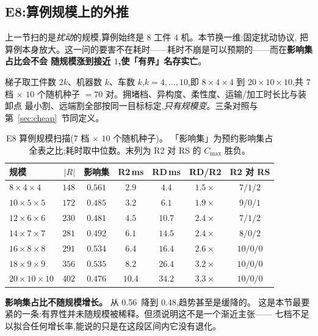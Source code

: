\documentclass[manuscript,screen,review]{acmart}
\newcommand{\NSeeds}{10}
\newcommand{\ScaleKs}{7}
\newcommand{\ScalePairs}{70}
\newcommand{\ScaleJobsHi}{20}
\newcommand{\ScaleMachHi}{10}
\newcommand{\ScaleCloLo}{0.48}       %
\newcommand{\ScaleCloHi}{0.56}       %
\begin{document}
\subsection{E8:算例规模上的外推}
\label{sec:instscale}

上一节扫的是\emph{扰动}的规模,算例始终是 \(8\) 工件 \(4\) 机。本节换一维:固定扰动协议,
把算例本身放大。这一问的要害不在耗时——耗时不崩是可以预期的——而在\textbf{影响集占比会不会
随规模涨到接近 \(1\),使「有界」名存实亡}。

梯子取工件数 \(2k\)、机器数 \(k\)、车数 \(k\),\(k=4,\dots,10\),即 \(8\times4\times4\) 到
\(\ScaleJobsHi\times\ScaleMachHi\times\ScaleMachHi\),共 \(\ScaleKs\) 档 \(\times\)
\(\NSeeds\) 个随机种子 \(=\ScalePairs\) 对。拥堵档、异构度、柔性度、运输/加工时长比与装卸点
最小割、远端割全部按同一目标标定,\emph{只有规模变}。三条对照与第~\ref{sec:cheap}~节同定义。

\begin{table}[t]
\centering
\caption{E8 算例规模扫描(\(\ScaleKs\) 档 \(\times\) \(\NSeeds\) 个随机种子)。
「影响集」为预约影响集占全表之比;耗时取中位数。末列为 R2 对 RS 的 \(C_{\max}\) 胜负。}
\label{tab:instscale}
\small
\begin{tabular}{@{}lrccccc@{}}
\toprule
规模 & \(|R|\) & 影响集 & R2\,ms & RD\,ms & RD/R2 & R2 对 RS \\
\midrule
\(8\times4\times4\)    & \(148\) & \(0.561\) & \(2.9\)  & \(4.4\)  & \(1.5\times\) & \(7/1/2\) \\
\(10\times5\times5\)   & \(172\) & \(0.485\) & \(3.2\)  & \(6.1\)  & \(1.9\times\) & \(9/0/1\) \\
\(12\times6\times6\)   & \(230\) & \(0.481\) & \(4.5\)  & \(10.7\) & \(2.4\times\) & \(7/1/2\) \\
\(14\times7\times7\)   & \(281\) & \(0.492\) & \(6.1\)  & \(14.5\) & \(2.4\times\) & \(8/0/2\) \\
\(16\times8\times8\)   & \(291\) & \(0.534\) & \(6.4\)  & \(16.4\) & \(2.6\times\) & \(10/0/0\) \\
\(18\times9\times9\)   & \(356\) & \(0.535\) & \(8.2\)  & \(26.4\) & \(3.2\times\) & \(10/0/0\) \\
\(20\times10\times10\) & \(402\) & \(0.476\) & \(10.4\) & \(34.2\) & \(3.3\times\) & \(10/0/0\) \\
\bottomrule
\end{tabular}
\end{table}

\textbf{影响集占比不随规模增长。} 从 \ScaleCloHi\ 降到 \ScaleCloLo,趋势甚至是缓降的。
这是本节最要紧的一条:有界性并未随规模被稀释。但须说明这不是一个渐近主张——
七档不足以拟合任何增长率,能说的只是在这段区间内它没有退化。
\end{document}
